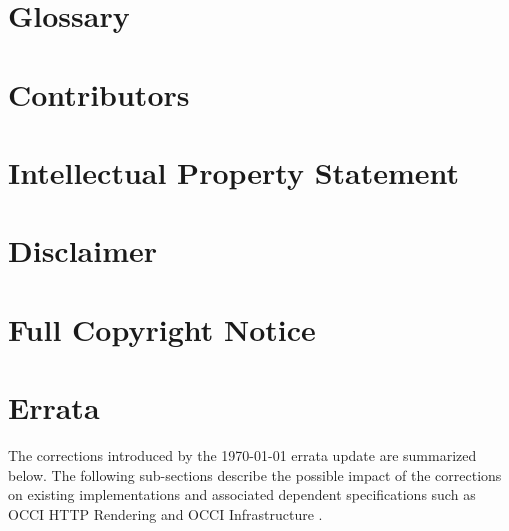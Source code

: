 \documentclass[10pt,a4paper]{article}
\begin{document}
\section{Glossary}
\label{sec:glossary}


\section{Contributors}


\section{Intellectual Property Statement}


\section{Disclaimer}


\section{Full Copyright Notice}





\appendix

\newpage
\section{Errata}
\label{sec:errata}

The corrections introduced by the {\today} errata update are summarized below.
The following sub-sections describe the possible impact of the corrections
on existing implementations and associated dependent specifications such
as OCCI HTTP Rendering \cite{occi:http_rendering} and  OCCI Infrastructure
\cite{occi:infrastructure}.
\end{document}
